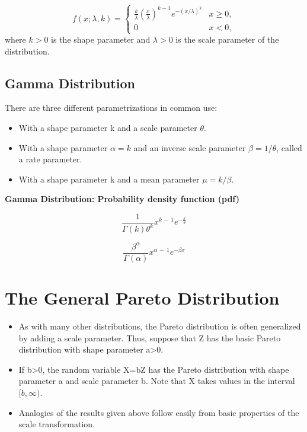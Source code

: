\documentclass[]{report}
\begin{document}
\[
f(x;\lambda,k) =
\begin{cases}
\frac{k}{\lambda}\left(\frac{x}{\lambda}\right)^{k-1}e^{-(x/\lambda)^{k}} & x\geq 0 ,\\
0 & x<0,
\end{cases}
\]
where $k > 0$ is the shape parameter and $\lambda > 0$ is the scale parameter of the distribution.




\subsection{Gamma Distribution}

There are three different parametrizations in common use: \bigskip
\begin{itemize}
\item With a shape parameter k and a scale parameter $\theta$. \bigskip
\item With a shape parameter $\alpha = k$ and an inverse scale parameter $\beta = 1/\theta$, called a rate parameter. \bigskip
\item With a shape parameter k and a mean parameter $\mu = k/\beta$.
\end{itemize}

\noindent \textbf{Gamma Distribution: Probability density function (pdf)}

\[{\frac {1}{\Gamma (k)\theta ^{k}}}x^{k\,-\,1}e^{-{\frac {x}{\theta }}}\]

\[{\frac {\beta ^{\alpha }}{\Gamma (\alpha )}}x^{\alpha \,-\,1}e^{-\beta x}\]
\newpage

\section{The General Pareto Distribution}

\begin{itemize}
\item As with many other distributions, the Pareto distribution is often generalized by adding a scale parameter. Thus, suppose that Z has the basic Pareto distribution with shape parameter a>0.
\item If b>0, the random variable X=bZ has the Pareto distribution with shape parameter a and scale parameter b. Note that X takes values in the interval $[b, \infty)$.

\item Analogies of the results given above follow easily from basic properties of the scale transformation.

\end{itemize}
\end{document}
